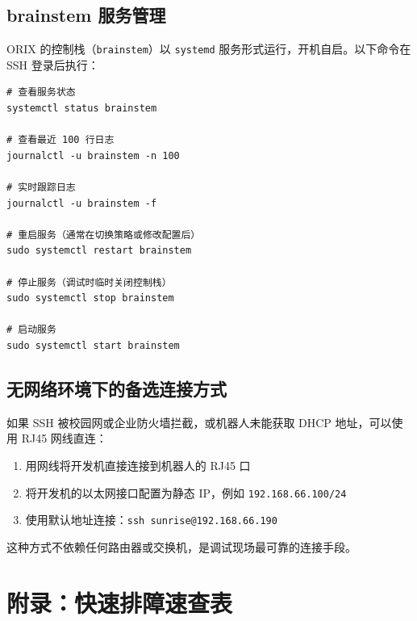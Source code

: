 \documentclass[a4paper,11pt,openany]{book}
\begin{document}
\subsection{brainstem 服务管理}

ORIX 的控制栈（\texttt{brainstem}）以 \texttt{systemd} 服务形式运行，开机自启。以下命令在 SSH 登录后执行：

\begin{lstlisting}[style=bash]
# 查看服务状态
systemctl status brainstem

# 查看最近 100 行日志
journalctl -u brainstem -n 100

# 实时跟踪日志
journalctl -u brainstem -f

# 重启服务（通常在切换策略或修改配置后）
sudo systemctl restart brainstem

# 停止服务（调试时临时关闭控制栈）
sudo systemctl stop brainstem

# 启动服务
sudo systemctl start brainstem
\end{lstlisting}

\subsection{无网络环境下的备选连接方式}

如果 SSH 被校园网或企业防火墙拦截，或机器人未能获取 DHCP 地址，可以使用 RJ45 网线直连：

\begin{enumerate}[nosep]
  \item 用网线将开发机直接连接到机器人的 RJ45 口
  \item 将开发机的以太网接口配置为静态 IP，例如 \texttt{192.168.66.100/24}
  \item 使用默认地址连接：\texttt{ssh sunrise@192.168.66.190}
\end{enumerate}

\noindent 这种方式不依赖任何路由器或交换机，是调试现场最可靠的连接手段。

\section*{附录：快速排障速查表}
\end{document}
